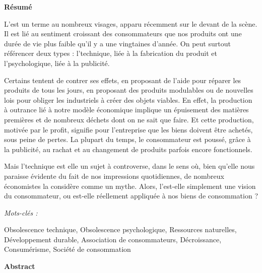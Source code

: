 
\begin{Large}
\textbf{Résumé}
\end{Large}

\vspace{1\baselineskip}

L'\op est un terme au nombreux visages, apparu récemment sur le devant de la scène. Il est lié au sentiment croissant des consommateurs que nos produits ont une durée de vie plus faible qu'il y a une vingtaines d'année. 
On peut surtout référencer deux types : l'\op technique, liée à la fabrication du produit et l'\op psychologique, liée à la publicité.

Certains tentent de contrer ses effets, en proposant de l'aide pour réparer les produits de tous les jours, en proposant des produits modulables ou de nouvelles lois pour obliger les industriels à créer des objets viables. 
En effet, la production à outrance lié à notre modèle économique implique un épuisement des matières premières et de nombreux déchets dont on ne sait que faire. Et cette production, motivée par le profit, signifie pour l'entreprise que les biens doivent être achetés, sous peine de pertes. La plupart du temps, le consommateur est poussé, grâce à la publicité, au rachat et au changement de produits parfois encore fonctionnels. 

Mais l'\op technique est elle un sujet à controverse, dans le sens où, bien qu'elle nous paraisse évidente du fait de nos impressions quotidiennes, de nombreux économistes la considère comme un mythe. Alors, l'\op est-elle simplement une vision du consommateur, ou est-elle réellement appliquée à nos biens de consommation ?

\vspace{2\baselineskip}

\begin{large} \emph{Mots-clés :} \end{large}Obsolescence technique, Obsolescence psychologique, Ressources naturelles, Développement durable, Association de consommateurs, Décroissance, Consumérisme, Société de consommation


\vspace{4\baselineskip}



\begin{Large}
\textbf{Abstract}
\end{Large}